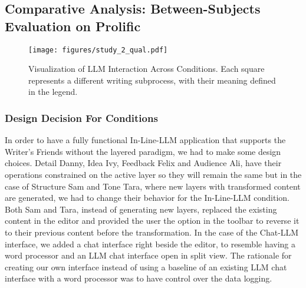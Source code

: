 \subsection{Comparative Analysis: Between-Subjects Evaluation on Prolific}



\begin{figure*}[t!]
  \centering
  \texttt{[image: figures/study\_2\_qual.pdf]}
  \caption{Visualization of LLM Interaction Across Conditions. Each square represents a different writing subprocess, with their meaning defined in the legend.}
  \label{fig:all_conditions}
\end{figure*}


\subsubsection{Design Decision For Conditions}
In order to have a fully functional In-Line-LLM application that supports the Writer's Friends without the layered paradigm, we had to make some design choices. Detail Danny, Idea Ivy, Feedback Felix and Audience Ali, have their operations constrained on the active layer so they will remain the same but in the case of Structure Sam and Tone Tara, where new layers with transformed content are generated, we had to change their behavior for the In-Line-LLM condition. Both Sam and Tara, instead of generating new layers, replaced the existing content in the editor and provided the user the option in the toolbar to reverse it to their previous content before the transformation. In the case of the Chat-LLM interface, we added a chat interface right beside the editor, to resemble having a word processor and an LLM chat interface open in split view. The rationale for creating our own interface instead of using a baseline of an existing LLM chat interface with a word processor was to have control over the data logging.

